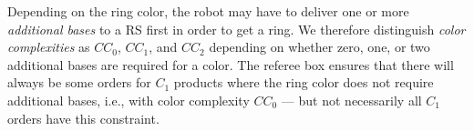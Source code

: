 \documentclass[12pt,twoside]{article}
\begin{document}
Depending on the ring color, the robot may have to deliver one or more
\emph{additional bases} to a RS first in order to get a ring. We
therefore distinguish \emph{color complexities} as $CC_0$, $CC_1$, and
$CC_2$ depending on whether zero, one, or two additional bases are
required for a color. The referee box ensures that there will always
be some orders for $C_1$ products where the ring color does not
require additional bases, i.e., with color complexity $CC_0$ --- but
not necessarily all $C_1$ orders have this constraint.

\begin{figure}
\end{figure}
\end{document}
